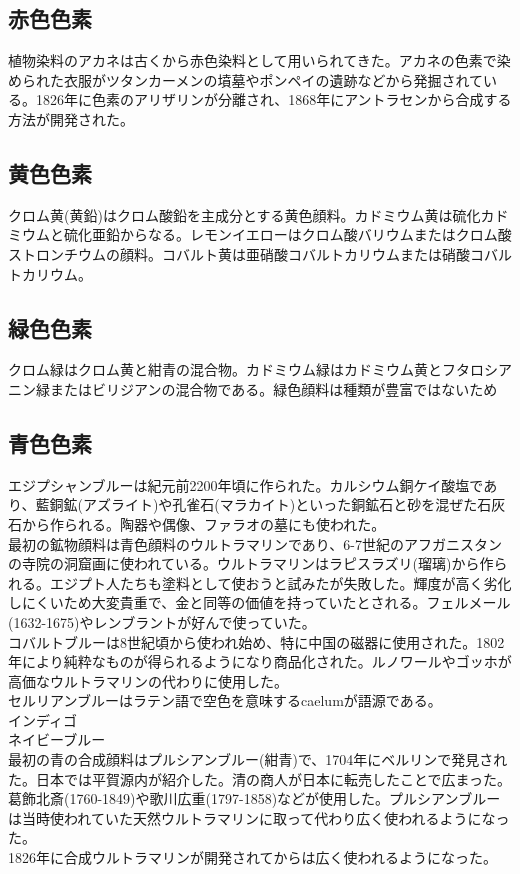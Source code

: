 		\subsection{赤色色素}
			植物染料のアカネは古くから赤色染料として用いられてきた。アカネの色素で染められた衣服がツタンカーメンの墳墓やポンペイの遺跡などから発掘されている。1826年に色素のアリザリンが分離され、1868年にアントラセンから合成する方法が開発された。
		\subsection{黄色色素}
			クロム黄(黄鉛)はクロム酸鉛を主成分とする黄色顔料。カドミウム黄は硫化カドミウムと硫化亜鉛からなる。レモンイエローはクロム酸バリウムまたはクロム酸ストロンチウムの顔料。コバルト黄は亜硝酸コバルトカリウムまたは硝酸コバルトカリウム。
		\subsection{緑色色素}
			クロム緑はクロム黄と紺青の混合物。カドミウム緑はカドミウム黄とフタロシアニン緑またはビリジアンの混合物である。緑色顔料は種類が豊富ではないため
		\subsection{青色色素}
			エジプシャンブルーは紀元前2200年頃に作られた。カルシウム銅ケイ酸塩であり、藍銅鉱(アズライト)や孔雀石(マラカイト)といった銅鉱石と砂を混ぜた石灰石から作られる。陶器や偶像、ファラオの墓にも使われた。\\
			最初の鉱物顔料は青色顔料のウルトラマリンであり、6-7世紀のアフガニスタンの寺院の洞窟画に使われている。ウルトラマリンはラピスラズリ(瑠璃)から作られる。エジプト人たちも塗料として使おうと試みたが失敗した。輝度が高く劣化しにくいため大変貴重で、金と同等の価値を持っていたとされる。フェルメール(1632-1675)やレンブラントが好んで使っていた。\\
			コバルトブルーは8世紀頃から使われ始め、特に中国の磁器に使用された。1802年により純粋なものが得られるようになり商品化された。ルノワールやゴッホが高価なウルトラマリンの代わりに使用した。\\
			セルリアンブルーはラテン語で空色を意味するcaelumが語源である。\\
			インディゴ\\
			ネイビーブルー\\
			最初の青の合成顔料はプルシアンブルー(紺青)で、1704年にベルリンで発見された。日本では平賀源内が紹介した。清の商人が日本に転売したことで広まった。葛飾北斎(1760-1849)や歌川広重(1797-1858)などが使用した。プルシアンブルーは当時使われていた天然ウルトラマリンに取って代わり広く使われるようになった。\\
			1826年に合成ウルトラマリンが開発されてからは広く使われるようになった。\\
